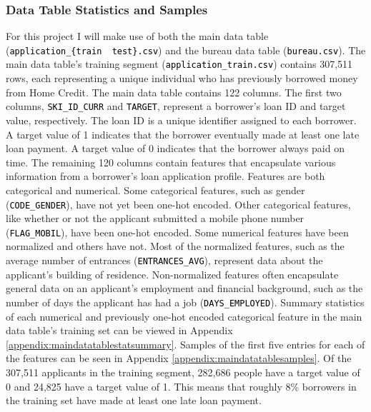 \documentclass[12pt, letterpaper]{article}
\begin{document}
\subsubsection{Data Table Statistics and Samples}
For this project I will make use of both the main data table (\colorbox{backcolor}{\textcolor{black}{\texttt{application_\{train \textbar~test\}.csv}}}) and the bureau data table (\colorbox{backcolor}{\textcolor{black}{\texttt{bureau.csv}}}). The main data table's training segment (\colorbox{backcolor}{\textcolor{black}{\texttt{application_train.csv}}}) contains 307,511 rows, each representing a unique individual who has previously borrowed money from Home Credit. The main data table contains 122 columns. The first two columns, \colorbox{backcolor}{\textcolor{black}{\texttt{SKI_ID_CURR}}} and \colorbox{backcolor}{\textcolor{black}{\texttt{TARGET}}}, represent a borrower's loan ID and target value, respectively. The loan ID is a unique identifier assigned to each borrower. A target value of 1 indicates that the borrower eventually made at least one late loan payment. A target value of 0 indicates that the borrower always paid on time. The remaining 120 columns contain features that encapsulate various information from a borrower's loan application profile. Features are both categorical and numerical. Some categorical features, such as gender (\colorbox{backcolor}{\textcolor{black}{\texttt{CODE_GENDER}}}), have not yet been one-hot encoded. Other categorical features, like whether or not the applicant submitted a mobile phone number (\colorbox{backcolor}{\textcolor{black}{\texttt{FLAG_MOBIL}}}), have been one-hot encoded. Some numerical features have been normalized and others have not. Most of the normalized features, such as the average number of entrances (\colorbox{backcolor}{\textcolor{black}{\texttt{ENTRANCES_AVG}}}), represent data about the applicant's building of residence. Non-normalized features often encapsulate general data on an applicant's employment and financial background, such as the number of days the applicant has had a job (\colorbox{backcolor}{\textcolor{black}{\texttt{DAYS_EMPLOYED}}}). Summary statistics of each numerical and previously one-hot encoded categorical feature in the main data table's training set can be viewed in Appendix \ref{appendix:maindatatablestatsummary}. Samples of the first five entries for each of the features can be seen in Appendix \ref{appendix:maindatatablesamples}. Of the 307,511 applicants in the training segment, 282,686 people have a target value of 0 and 24,825 have a target value of 1. This means that roughly 8\% borrowers in the training set have made at least one late loan payment.
\end{document}
